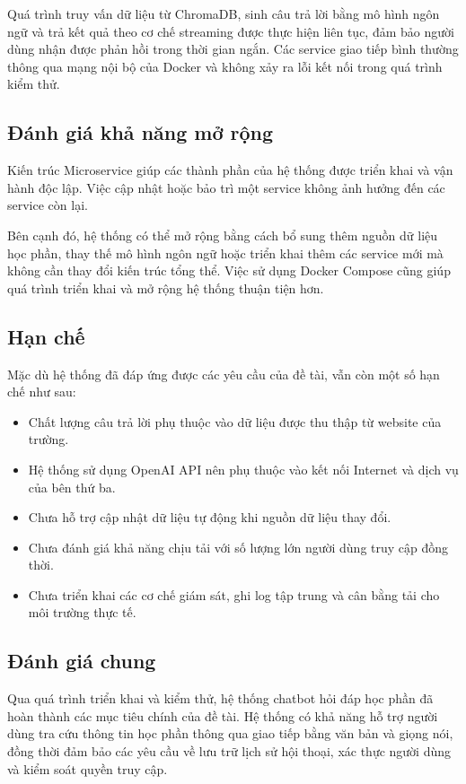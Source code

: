 \documentclass[../DoAn.tex]{subfiles}
\begin{document}
Quá trình truy vấn dữ liệu từ ChromaDB, sinh câu trả lời bằng mô hình ngôn ngữ và trả kết quả theo cơ chế streaming được thực hiện liên tục, đảm bảo người dùng nhận được phản hồi trong thời gian ngắn. Các service giao tiếp bình thường thông qua mạng nội bộ của Docker và không xảy ra lỗi kết nối trong quá trình kiểm thử.

\subsection{Đánh giá khả năng mở rộng}
Kiến trúc Microservice giúp các thành phần của hệ thống được triển khai và vận hành độc lập. Việc cập nhật hoặc bảo trì một service không ảnh hưởng đến các service còn lại.

Bên cạnh đó, hệ thống có thể mở rộng bằng cách bổ sung thêm nguồn dữ liệu học phần, thay thế mô hình ngôn ngữ hoặc triển khai thêm các service mới mà không cần thay đổi kiến trúc tổng thể. Việc sử dụng Docker Compose cũng giúp quá trình triển khai và mở rộng hệ thống thuận tiện hơn.

\subsection{Hạn chế}
Mặc dù hệ thống đã đáp ứng được các yêu cầu của đề tài, vẫn còn một số hạn chế như sau:

\begin{itemize}
    \item Chất lượng câu trả lời phụ thuộc vào dữ liệu được thu thập từ website của trường.
    \item Hệ thống sử dụng OpenAI API nên phụ thuộc vào kết nối Internet và dịch vụ của bên thứ ba.
    \item Chưa hỗ trợ cập nhật dữ liệu tự động khi nguồn dữ liệu thay đổi.
    \item Chưa đánh giá khả năng chịu tải với số lượng lớn người dùng truy cập đồng thời.
    \item Chưa triển khai các cơ chế giám sát, ghi log tập trung và cân bằng tải cho môi trường thực tế.
\end{itemize}
 
\subsection{Đánh giá chung}
Qua quá trình triển khai và kiểm thử, hệ thống chatbot hỏi đáp học phần đã hoàn thành các mục tiêu chính của đề tài. Hệ thống có khả năng hỗ trợ người dùng tra cứu thông tin học phần thông qua giao tiếp bằng văn bản và giọng nói, đồng thời đảm bảo các yêu cầu về lưu trữ lịch sử hội thoại, xác thực người dùng và kiểm soát quyền truy cập.
\end{document}
